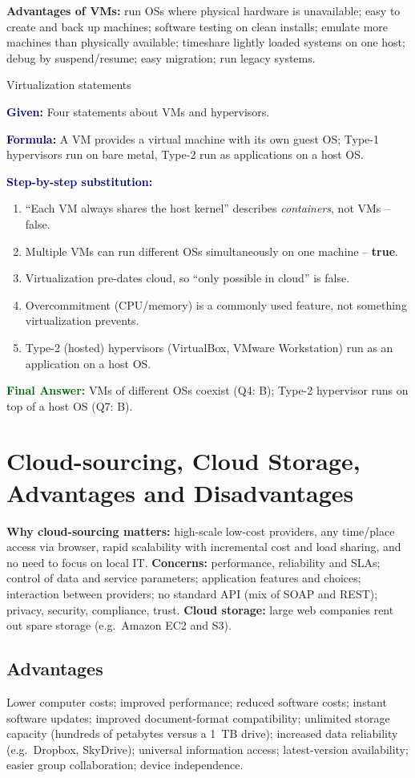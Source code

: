 \documentclass[11pt,a4paper,openany]{report}
\newcommand{\Given}{\par\textbf{\textcolor{navy}{Given:}} }
\newcommand{\Formula}{\par\textbf{\textcolor{navy}{Formula:}} }
\newcommand{\Steps}{\par\textbf{\textcolor{navy}{Step-by-step substitution:}}\par}
\newcommand{\Answer}{\par\textbf{\textcolor{darkgreen}{Final Answer:}} }
\begin{document}
\textbf{Advantages of VMs:} run OSs where physical hardware is unavailable; easy to create and back up
machines; software testing on clean installs; emulate more machines than physically available;
timeshare lightly loaded systems on one host; debug by suspend/resume; easy migration; run legacy
systems.

\begin{solved}{Virtualization statements}
\Given Four statements about VMs and hypervisors.
\Formula A VM provides a virtual machine with its own guest OS; Type-1 hypervisors run on bare metal,
Type-2 run as applications on a host OS.
\Steps
\begin{enumerate}[leftmargin=*]
  \item ``Each VM always shares the host kernel'' describes \emph{containers}, not VMs -- false.
  \item Multiple VMs can run different OSs simultaneously on one machine -- \textbf{true}.
  \item Virtualization pre-dates cloud, so ``only possible in cloud'' is false.
  \item Overcommitment (CPU/memory) is a commonly used feature, not something virtualization prevents.
  \item Type-2 (hosted) hypervisors (VirtualBox, VMware Workstation) run as an application on a host OS.
\end{enumerate}
\Answer VMs of different OSs coexist (Q4: B); Type-2 hypervisor runs on top of a host OS (Q7: B).
\end{solved}

\section{Cloud-sourcing, Cloud Storage, Advantages and Disadvantages}
\textbf{Why cloud-sourcing matters:} high-scale low-cost providers, any time/place access via browser,
rapid scalability with incremental cost and load sharing, and no need to focus on local IT.
\textbf{Concerns:} performance, reliability and SLAs; control of data and service parameters;
application features and choices; interaction between providers; no standard API (mix of SOAP and REST);
privacy, security, compliance, trust.
\textbf{Cloud storage:} large web companies rent out spare storage (e.g.\ Amazon EC2 and S3).

\subsection{Advantages}
Lower computer costs; improved performance; reduced software costs; instant software updates; improved
document-format compatibility; unlimited storage capacity (hundreds of petabytes versus a 1~TB drive);
increased data reliability (e.g.\ Dropbox, SkyDrive); universal information access; latest-version
availability; easier group collaboration; device independence.
\end{document}
